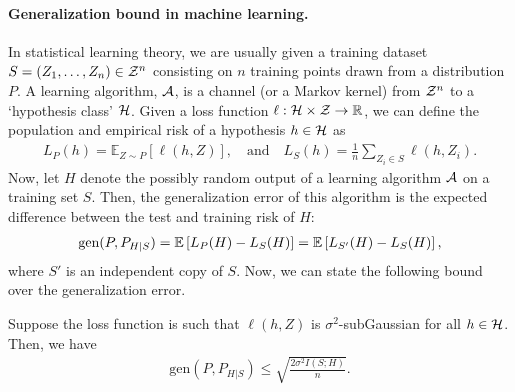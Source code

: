             \paragraph{ Generalization bound in machine learning.}  In statistical learning theory, we are usually given a training dataset $S = (Z_1, \ldots, Z_n) \in \mathcal{Z}^n$ consisting on $n$ \iid training points drawn from a distribution $P$. A learning algorithm, $\mathcal{A}$, is a channel (or a Markov kernel) from $\mathcal{Z}^n$ to a `hypothesis class' $\mathcal{H}$. Given a loss function $\ell:\mathcal{H} \times \mathcal{Z} \to \mathbb{R}$, we can define the population and empirical risk of a hypothesis $h \in \mathcal{H}$ as 
            \begin{align}
                L_P(h) = \mathbb{E}_{Z \sim P}[\ell(h, Z)],  \quad \text{and} \quad 
                L_S(h) = \frac{1}{n} \sum_{Z_i \in S} \ell(h, Z_i). 
            \end{align}
            Now, let $H$ denote the possibly random output of a learning algorithm $\mathcal{A}$ on a training set $S$. Then, the generalization error of this algorithm is the expected difference between the test and training risk of $H$:
            \begin{align}
                \text{gen}(P, P_{H|S}) = \mathbb{E}\left[ L_P(H) - L_S(H) \right] = \mathbb{E}\left[ L_{S'}(H) - L_S(H) \right], 
            \end{align}
            where $S'$ is an independent copy of $S$. Now, we can state the following bound over the generalization error. 
            \begin{proposition}
                \label{prop:generalization-error} 
                Suppose the loss function is such that $\ell(h, Z)$ is $\sigma^2$-subGaussian for all $h \in \mathcal{H}$. Then, we have 
                \begin{align}
                    \text{gen}(P, P_{H|S}) \leq \sqrt{ \frac{2 \sigma^2 I(S; H)}{n}}. 
                \end{align}
            \end{proposition}
